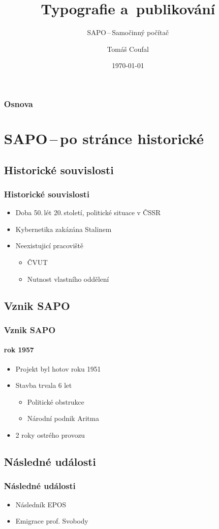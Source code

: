 \documentclass{beamer}
\title{Typografie a~publikování}
\subtitle{SAPO\,--\,Samočinný počítač}
\author{Tomáš Coufal}
\institute{Fakulta informačních technologií \\ Vysoké učení technické v~Brně}
\date{\today}
\begin{document}
    \frame{\titlepage}
    \begin{frame}
       \frametitle{Osnova}
        \tableofcontents
    \end{frame}
\section{SAPO\,--\,po stránce historické}
\subsection{Historické souvislosti}
    \begin{frame}
        \frametitle{Historické souvislosti}
        \begin{itemize}
            \item Doba 50.\,lét 20.\,století, politické situace v ČSSR
            \item Kybernetika zakázána Stalinem
            \item Neexistujicí pracoviště
            \begin{itemize}
                \item ČVUT
                \item Nutnost vlastního oddělení
            \end{itemize}
        \end{itemize}
    \end{frame}
\subsection{Vznik SAPO}
    \begin{frame}
        \frametitle{Vznik SAPO}
        \framesubtitle{rok 1957}
        \begin{itemize}
            \item Projekt byl hotov roku 1951
            \item Stavba trvala 6 let
            \begin{itemize}
              \item Politické obstrukce
              \item Národní podnik Aritma
            \end{itemize}
            \item 2 roky ostrého provozu
        \end{itemize}
    \end{frame}
\subsection{Následné události}
    \begin{frame}
        \frametitle{Následné události}
        \begin{itemize}
            \item Následník EPOS
            \item Emigrace prof. Svobody
        \end{itemize}
    \end{frame}
\end{document}
